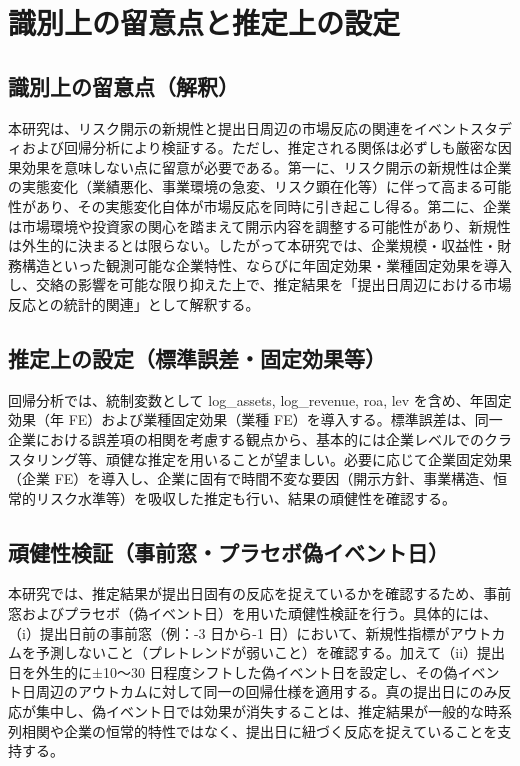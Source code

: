 \section{識別上の留意点と推定上の設定}

\subsection{識別上の留意点（解釈）}

本研究は、リスク開示の新規性と提出日周辺の市場反応の関連をイベントスタディおよび回帰分析により検証する。ただし、推定される関係は必ずしも厳密な因果効果を意味しない点に留意が必要である。第一に、リスク開示の新規性は企業の実態変化（業績悪化、事業環境の急変、リスク顕在化等）に伴って高まる可能性があり、その実態変化自体が市場反応を同時に引き起こし得る。第二に、企業は市場環境や投資家の関心を踏まえて開示内容を調整する可能性があり、新規性は外生的に決まるとは限らない。したがって本研究では、企業規模・収益性・財務構造といった観測可能な企業特性、ならびに年固定効果・業種固定効果を導入し、交絡の影響を可能な限り抑えた上で、推定結果を「提出日周辺における市場反応との統計的関連」として解釈する。

\subsection{推定上の設定（標準誤差・固定効果等）}

回帰分析では、統制変数として log\_assets, log\_revenue, roa, lev を含め、年固定効果（年 FE）および業種固定効果（業種 FE）を導入する。標準誤差は、同一企業における誤差項の相関を考慮する観点から、基本的には企業レベルでのクラスタリング等、頑健な推定を用いることが望ましい。必要に応じて企業固定効果（企業 FE）を導入し、企業に固有で時間不変な要因（開示方針、事業構造、恒常的リスク水準等）を吸収した推定も行い、結果の頑健性を確認する。

\subsection{頑健性検証（事前窓・プラセボ偽イベント日）}

本研究では、推定結果が提出日固有の反応を捉えているかを確認するため、事前窓およびプラセボ（偽イベント日）を用いた頑健性検証を行う。具体的には、（i）提出日前の事前窓（例：-3 日から-1 日）において、新規性指標がアウトカムを予測しないこと（プレトレンドが弱いこと）を確認する。加えて（ii）提出日を外生的に±10〜30 日程度シフトした偽イベント日を設定し、その偽イベント日周辺のアウトカムに対して同一の回帰仕様を適用する。真の提出日にのみ反応が集中し、偽イベント日では効果が消失することは、推定結果が一般的な時系列相関や企業の恒常的特性ではなく、提出日に紐づく反応を捉えていることを支持する。

